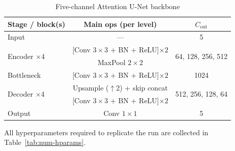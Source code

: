 \documentclass[12pt]{iopart}
\begin{document}
\begin{table}[htbp]
    \centering
    \caption{Five-channel Attention U-Net backbone}
    \vspace{0.1cm}
    \label{tab:unet_architecture}
    \begin{tabular}{@{}l c c@{}}
        \toprule
        \textbf{Stage / block(s)} & \textbf{Main ops (per level)} & \textbf{$C_\text{out}$} \\
        \midrule
        Input & --- & 5 \\[3pt]
        
        \multirow{2}{*}{Encoder $\times$4} 
          & [Conv $3\times3$ + BN + ReLU]$\times2$ & \multirow{2}{*}{64, 128, 256, 512}\\
          & MaxPool $2\times2$                        & \\[3pt]
        
        Bottleneck & [Conv $3\times3$ + BN + ReLU]$\times2$ & 1024 \\[3pt]
        
        \multirow{2}{*}{Decoder $\times$4}
          & Upsample ($\uparrow$2) + skip concat      & \multirow{2}{*}{512, 256, 128, 64}\\
          & [Conv $3\times3$ + BN + ReLU]$\times2$  & \\[3pt]
        
        Output & Conv $1\times1$ & 5 \\
        \bottomrule
        \end{tabular}
        
  \end{table}
  

All hyperparameters required to replicate the run are collected in Table~\ref{tab:num-hparams}.
\end{document}
